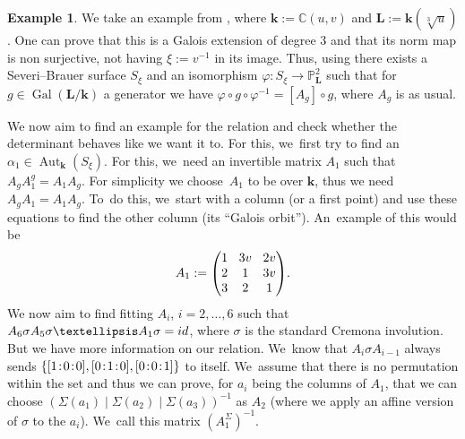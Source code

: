 \documentclass[10pt,a4paper]{amsart}
\newcommand{\id}{\textup{id}}
\newcommand{\sep}{\mkern2mu{:}\mkern2mu}
\DeclareMathOperator{\Gal}{Gal}
\theoremstyle{definition}
\newtheorem{example}[theorem]{Example}
\newcommand{\kk}{{\boldsymbol{k}}}
\newcommand{\LL}{{\boldsymbol{L}}}
\DeclareMathOperator{\Aut}{Aut}
\begin{document}
\begin{example}
We take an example from \cite[Cor.\,2.3.6]{BSY}, where $\kk := \mathbb{C}(u,v)$ and $\LL := \kk(\sqrt[3]{u})$. One can prove that this is a Galois extension of degree $3$ and that its norm map is non surjective, not having $\xi := v^{-1}$ in its image. Thus, using {\cite[Lem.\,2.3.3]{BSY}} there exists a Severi--Brauer surface $S_{\xi}$ and an isomorphism $\varphi \colon S_{\xi} \to \mathbb{P}_{\LL}^2 $ such that for $g \in \Gal(\LL/ \kk)$ a generator we have $\varphi \circ g \circ \varphi^{-1} = [A_g] \circ g$, where $A_g$ is as usual.

We now aim to find an example for the relation and check whether the determinant behaves like we want it to. For this, we~first try to find an $\alpha_1 \in \Aut_{\kk}(S_{\xi})$. For this, we~need an invertible matrix $A_1$ such that $A_gA_1^g = A_1A_g$. For simplicity we choose~$A_1$ to be over $\kk$, thus we need $A_gA_1 = A_1A_g$. To~do this, we~start with a column (or a first point) and use these equations to find the other column (its ``Galois orbit''). An~example of this would be
\[\arraycolsep4.5pt
A_1 := \begin{pmatrix}
1 & 3v & 2v \\
2 & 1 & 3v \\
3 & 2 & 1 \\
\end{pmatrix}\!.
\]
We now aim to find fitting $A_i$, $i=2, \dots , 6$ such that $A_6 \sigma A_5 \sigma \dots A_1 \sigma = \id$, where $\sigma$ is the standard Cremona involution. But we have more information on our relation. We~know that $A_i \sigma A_{i-1}$ always sends $\{ [1\sep 0\sep 0], [0\sep 1\sep 0], [0\sep 0\sep 1] \}$ to itself. We~assume that there is no permutation within the set and thus we can prove, for $a_{i}$ being the columns of $A_1$, that we can choose $(\Sigma(a_{1}) \mid \Sigma(a_{2}) \mid \Sigma(a_{3}) )^{-1}$ as $A_2$ (where we apply an affine version of $\sigma$ to the $a_i$). We~call this matrix $(A_1^{\Sigma})^{-1}$.


\end{example}
\end{document}
